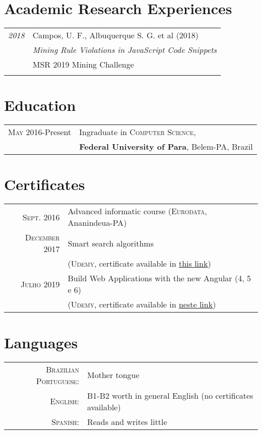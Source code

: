 \documentclass[a4paper,10pt]{article}
\begin{document}
\section{Academic Research Experiences}
\begin{tabular}{r|p{11cm}}
 \emph{2018} & Campos, U. F., Albuquerque S. G. et al (2018)\\
 & \textit{Mining Rule Violations in JavaScript Code Snippets}\\
 & MSR 2019 Mining Challenge\\\multicolumn{2}{c}{} \\
\end{tabular}

\section{Education}
\begin{tabular}{rl}	
 \textsc{May} 2016-Present & Ingraduate in \textsc{Computer Science}, \\
& \textbf{Federal University of Para}, Belem-PA, Brazil
\end{tabular}

\section{Certificates}
\begin{tabular}{rl}
 \textsc{Sept.} 2016 & Advanced informatic course (\textsc{Eurodata}, Ananindeua-PA)\\
\textsc{December} 2017 & Smart search algorithms\\ & (\textsc{Udemy}, \footnotesize{certificate available in \href{https://www.udemy.com/certificate/UC-9414I0UR/}{this link}})\\
\textsc{Julho} 2019 &  Build Web Applications with the new Angular (4, 5 e 6)\\ & (\textsc{Udemy}, \footnotesize{certificate available in \href{https://www.udemy.com/certificate/UC-P6VGWTET/}{neste link}})
\end{tabular}

\section{Languages}
\begin{tabular}{rl}
 \textsc{Brazilian Portuguese:}& Mother tongue\\
\textsc{English:}&B1-B2 worth in general English (no certificates available)\\
\textsc{Spanish:}&Reads and writes little\\
\end{tabular}
\end{document}
